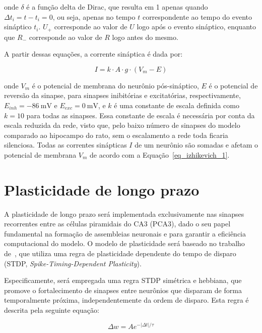 onde $\delta$ é a função delta de Dirac, que resulta em 1 apenas quando $\Delta t_i = t - t_i = 0$, ou seja, apenas no tempo $t$
correspondente ao tempo do evento sináptico $t_i$. $U_{+}$ corresponde ao valor de $U$ logo após o evento sináptico, enquanto que
$R_{-}$ corresponde ao valor de $R$ logo antes do mesmo.

A partir dessas equações, a corrente sináptica é dada por:

\begin{equation}
    \label{eq_tsodyks_I}
    I = k \cdot A \cdot g \cdot (V_m - E)
\end{equation}

onde $V_m$ é o potencial de membrana do neurônio pós-sináptico, $E$ é o potencial de reversão da sinapse, para sinapses
inibitórias e excitatórias, respectivamente, $E_{inh} = \SI{-86}{\milli\volt}$ e $E_{exc} = \SI{0}{\milli\volt}$, e $k$ é uma
constante de escala definida como $k = 10$ para todas as sinapses. Essa constante de escala é necessária por conta da escala
reduzida da rede, visto que, pelo baixo número de sinapses do modelo comparado ao hipocampo do rato, sem o escalamento a rede toda
ficaria silenciosa. Todas as correntes sinápticas $I$ de um neurônio são somadas e afetam o potencial de membrana $V_m$ de acordo
com a Equação~\ref{eq_izhikevich_1}.





\section{Plasticidade de longo prazo}

A plasticidade de longo prazo será implementada exclusivamente nas sinapses recorrentes entre as células piramidais do CA3 (PCA3),
dado o seu papel fundamental na formação de assembleias neuronais e para garantir a eficiência computacional do modelo. O modelo
de plasticidade será baseado no trabalho de~, que utiliza uma regra de plasticidade dependente do
tempo de disparo (STDP, \textit{Spike-Timing-Dependent Plasticity}).

Especificamente, será empregada uma regra STDP simétrica e hebbiana, que promove o fortalecimento de sinapses entre neurônios que
disparam de forma temporalmente próxima, independentemente da ordem de disparo. Esta regra é descrita pela seguinte equação: 

\begin{equation}
    \label{eq:stdp}
    \Delta w = A e^{-|\Delta t|/\tau}
\end{equation}

